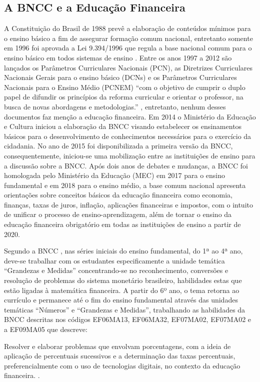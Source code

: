 \subsection{A BNCC e a Educação Financeira}
A Constituição do Brasil de 1988 prevê a elaboração de conteúdos mínimos para o ensino básico a fim de assegurar formação comum nacional, entretanto somente em 1996 foi aprovada a Lei 9.394/1996 que regula a base nacional comum para o ensino básico em todos sistemas de ensino \cite{brasil1996}. Entre os anos 1997 a 2012 são lançados os Parâmetros Curriculares Nacionais (PCN), as Diretrizes Curriculares Nacionais Gerais para o ensino básico (DCNs) e os Parâmetros Curriculares Nacionais para o Ensino Médio (PCNEM) “com o objetivo de cumprir o duplo papel de difundir os princípios da reforma curricular e orientar o professor, na busca de novas abordagens e metodologias.” \cite{brasil2017b}, entretanto, nenhum desses documentos faz menção a educação financeira. Em 2014 o Ministério da Educação e Cultura iniciou a elaboração da BNCC visando estabelecer os ensinamentos básicos para o desenvolvimento de conhecimentos necessários para o exercício da cidadania. No ano de 2015 foi disponibilizada a primeira versão da BNCC, consequentemente, iniciou-se uma mobilização entre as instituições de ensino para a discussão sobre a BNCC. Após dois anos de debates e mudanças, a BNCC foi homologada pelo Ministério da Educação (MEC) em 2017 para o ensino fundamental e em 2018 para o ensino médio, a base comum nacional  apresenta orientações sobre conceitos básicos da educação financeira como economia, finanças, taxas de juros, inflação, aplicações financeiras e impostos, com o intuito de unificar o processo de ensino-aprendizagem, além de tornar o ensino da educação financeira obrigatório em todas as instituições de ensino a partir de 2020.

Segundo a BNCC \cite{brasil2017a}, nas séries iniciais do ensino fundamental, do 1ª ao 4ª ano, deve-se trabalhar com os estudantes especificamente a unidade temática “Grandezas e Medidas” concentrando-se no reconhecimento, conversões e resolução de problemas do sistema monetário brasileiro, habilidades estas que estão ligadas à matemática financeira. A partir do 6º ano, o tema retorna ao currículo e permanece até o fim do ensino fundamental através das unidades temáticas “Números” e “Grandezas e Medidas”, trabalhando as habilidades da BNCC descritas nos códigos EF06MA13, EF06MA32, EF07MA02, EF07MA02 e a EF09MA05 que descreve:

\begin{citacao}
Resolver e elaborar problemas que envolvam porcentagens, com a ideia de aplicação de percentuais sucessivos e a determinação das taxas percentuais, preferencialmente com o uso de tecnologias digitais, no contexto da educação financeira. \cite{brasil2017a}.
\end{citacao}

